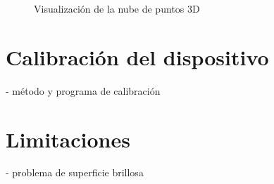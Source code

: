 \begin{figure}[!bth]
{        }
        \caption{Visualización de la nube de puntos 3D}
        \label{fig:ejemploVisualizacionNubePuntos}
\end{figure}

\section{Calibración del dispositivo}
- método y programa de calibración

\section{Limitaciones}

- problema de superficie brillosa





